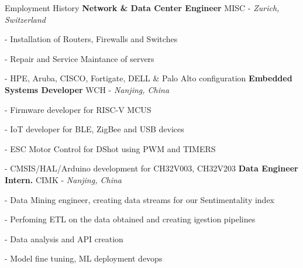 \begin{rubric}{Employment History}
%
	\textbf{Network \& Data Center Engineer} MISC - \emph{Zurich, Switzerland}
	\par - Installation of Routers, Firewalls and Switches
	\par - Repair and Service Maintance of servers
	\par - HPE, Aruba, CISCO, Fortigate, DELL \& Palo Alto configuration
%
%
%
\entry*[2021 -- 2024]%
	\textbf{Embedded Systems Developer} WCH - \emph{Nanjing, China}
	\par - Firmware developer for RISC-V MCUS
	\par - IoT developer for BLE, ZigBee and USB devices
	\par - ESC Motor Control for DShot using PWM and TIMERS
	\par - CMSIS/HAL/Arduino development for CH32V003, CH32V203
%
%
\entry*[2019 -- 2020]%
	\textbf{Data Engineer Intern.} CIMK - \emph{Nanjing, China}
	\par - Data Mining engineer, creating data streams for our Sentimentality index
	\par - Perfoming ETL on the data obtained and creating igestion pipelines
	\par - Data analysis and API creation
	\par - Model fine tuning, ML deployment devops
%
\end{rubric}
